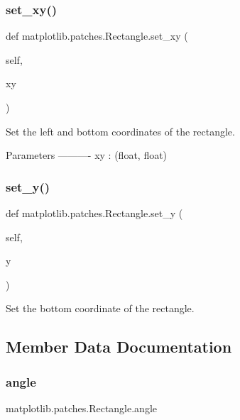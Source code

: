\subsubsection{\texorpdfstring{set\+\_\+xy()}{set\_xy()}}
{\footnotesize\ttfamily def matplotlib.\+patches.\+Rectangle.\+set\+\_\+xy (\begin{DoxyParamCaption}\item[{}]{self,  }\item[{}]{xy }\end{DoxyParamCaption})}

\begin{DoxyVerb}Set the left and bottom coordinates of the rectangle.

Parameters
----------
xy : (float, float)
\end{DoxyVerb}
 \mbox{\label{classmatplotlib_1_1patches_1_1Rectangle_a8a79507318cde4d59523b1de08461134}} 
\subsubsection{\texorpdfstring{set\+\_\+y()}{set\_y()}}
{\footnotesize\ttfamily def matplotlib.\+patches.\+Rectangle.\+set\+\_\+y (\begin{DoxyParamCaption}\item[{}]{self,  }\item[{}]{y }\end{DoxyParamCaption})}

\begin{DoxyVerb}Set the bottom coordinate of the rectangle.\end{DoxyVerb}
 

\subsection{Member Data Documentation}
\mbox{\label{classmatplotlib_1_1patches_1_1Rectangle_afcd2b4e52594d4950ba836cbbffc90de}} 
\subsubsection{\texorpdfstring{angle}{angle}}
{\footnotesize\ttfamily matplotlib.\+patches.\+Rectangle.\+angle}

